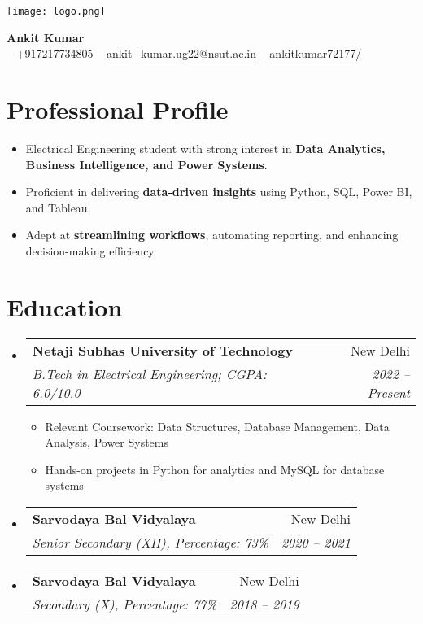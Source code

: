 \documentclass[a4paper,11pt]{article}
\makeatletter
\newcommand{\resumeItem}[1]{
  \item\small{{#1 \vspace{-2pt}}}
}
\newcommand{\resumeSubheading}[4]{
  \vspace{-2pt}\item
  \begin{tabular*}{0.97\textwidth}[t]{l@{\extracolsep{\fill}}r}
    \textbf{#1} & #2 \\
    \textit{\small#3} & \textit{\small #4} \\
  \end{tabular*}\vspace{-7pt}
}
\makeatother
\begin{document}
\noindent
\begin{minipage}{0.2\textwidth}
    \texttt{[image: logo.png]} %
\end{minipage}%
\begin{minipage}{0.8\textwidth}
    \begin{flushright}
        {\Huge \textbf{Ankit Kumar}} \\[8pt]
        \faPhone~ +917217734805 \quad
        \faEnvelope~ \href{mailto:ankit_kumar.ug22@nsut.ac.in}{ankit\_kumar.ug22@nsut.ac.in} \quad
        \faLinkedin~ \href{https://www.linkedin.com/in/ankitkumar72177/}{ankitkumar72177/}
    \end{flushright}
\end{minipage}


\vspace{10pt}

\section*{Professional Profile}
\begin{itemize}[leftmargin=*]
    \resumeItem{Electrical Engineering student with strong interest in \textbf{Data Analytics, Business Intelligence, and Power Systems}.}
    \resumeItem{Proficient in delivering \textbf{data-driven insights} using Python, SQL, Power BI, and Tableau.}
    \resumeItem{Adept at \textbf{streamlining workflows}, automating reporting, and enhancing decision-making efficiency.}
\end{itemize}

\section*{Education}
\begin{itemize}[leftmargin=*]
  \resumeSubheading
    {Netaji Subhas University of Technology}{New Delhi}
    {B.Tech in Electrical Engineering; CGPA: 6.0/10.0}{2022 -- Present}
    \begin{itemize}
        \resumeItem{Relevant Coursework: Data Structures, Database Management, Data Analysis, Power Systems}
        \resumeItem{Hands-on projects in Python for analytics and MySQL for database systems}
    \end{itemize}
  \resumeSubheading
    {Sarvodaya Bal Vidyalaya}{New Delhi}
    {Senior Secondary (XII), Percentage: 73\%}{2020 -- 2021}
  \resumeSubheading
    {Sarvodaya Bal Vidyalaya}{New Delhi}
    {Secondary (X), Percentage: 77\%}{2018 -- 2019}
\end{itemize}
\end{document}
